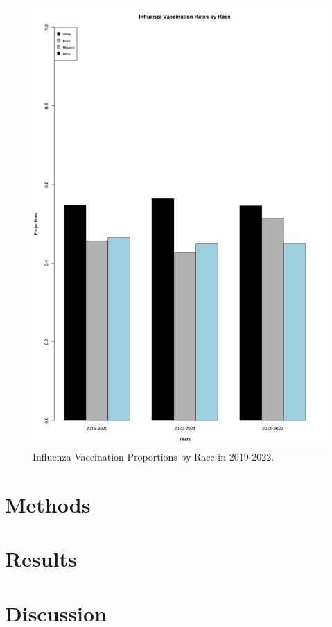 \documentclass[12pt]{article}
\begin{document}
\begin{figure}[ht!]
  \centering
  \includegraphics[width= 125mm ,scale=.75]{race.png}
  \caption{Influenza Vaccination Proportions by Race in 2019-2022.}
  \label{fig:race}
\end{figure}

\section{Methods}
\label{sec:Methods}

\section{Results}
\label{sec:Results}

\section{Discussion}
\label{sec:Discussion}



\end{document}
